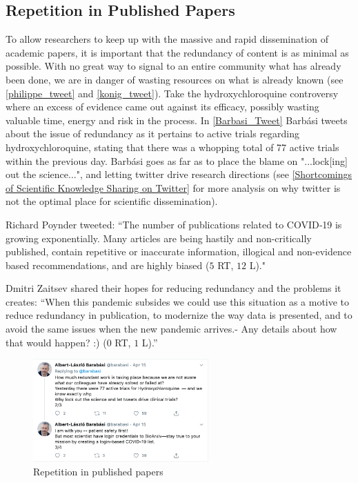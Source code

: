 \documentclass[acmsmall,authordraft]{acmart}
\begin{document}
\subsection{Repetition in Published Papers}
\label{Repetition in Published Papers}
To allow researchers to keep up with the massive and rapid dissemination of academic papers, it is important that the redundancy of content is as minimal as possible. With no great way to signal to an entire community what has already been done, we are in danger of wasting resources on what is already known (see \autoref{philippe_tweet} and \autoref{konig_tweet}). Take the hydroxychloroquine controversy where an excess of evidence came out against its efficacy, possibly wasting valuable time, energy and risk in the process. In \autoref{Barbasi_Tweet} Barb\'asi tweets about the issue of redundancy as it pertains to active trials regarding hydroxychloroquine, stating that there was a whopping total of 77 active trials within the previous day. Barb\'asi goes as far as to place the blame on "...lock[ing] out the science...", and letting twitter drive research directions (see \autoref{Shortcomings of Scientific Knowledge Sharing on Twitter} for more analysis on why twitter is not the optimal place for scientific dissemination). 

Richard Poynder tweeted: ``The number of publications related to COVID‐19 is growing exponentially. Many articles are being hastily and non-critically published, contain repetitive or inaccurate information, illogical and non-evidence based recommendations, and are highly biased \citep{poynder2020twitter}($5$ RT, $12$ L)." 


Dmitri Zaitsev shared their hopes for reducing redundancy and the problems it creates: ``When this pandemic subsides we could use this situation as a motive to reduce redundancy in publication, to modernize the way data is presented, and to avoid the same issues when the new pandemic arrives.- Any details about how that would happen? :) \citep{zaitsev2020twitter}($0$ RT, $1$ L).''

\begin{figure}
  \includegraphics[width=0.6\textwidth]{Pictures/barabasi tweet.png}
  \caption{Repetition in published papers \citep{Barbasi2020twitter}}
  \label{Barbasi_Tweet}
\end{figure}
\end{document}
